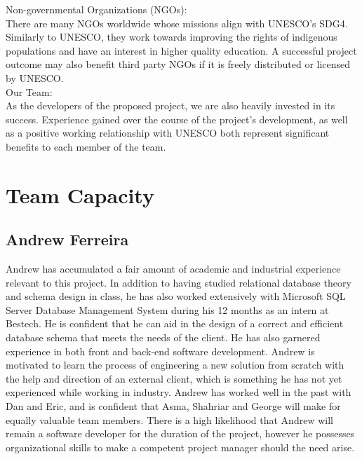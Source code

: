 \documentclass[11pt]{article}
\begin{document}
Non-governmental Organizations (NGOs): \\
There are many NGOs worldwide whose missions align with UNESCO's SDG4. Similarly to UNESCO, they work towards improving the rights of indigenous populations and have an interest in higher quality education. A successful project outcome may also benefit third party NGOs if it is freely distributed or licensed by UNESCO. \\

Our Team: \\
As the developers of the proposed project, we are also heavily invested in its success. Experience gained over the course of the project's development, as well as a positive working relationship with UNESCO both represent significant benefits to each member of the team. \\

\newpage

\section*{Team Capacity}

\subsection*{\textbf{Andrew Ferreira}}
Andrew has accumulated a fair amount of academic and industrial experience relevant to this project. In addition to having studied relational database theory and schema design in class, he has also worked extensively with Microsoft SQL Server Database Management System during his 12 months as an intern at Bestech. He is confident that he can aid in the design of a correct and efficient database schema that meets the needs of the client. He has also garnered experience in both front and back-end software development. Andrew is motivated to learn the process of engineering a new solution from scratch with the help and direction of an external client, which is something he has not yet experienced while working in industry. Andrew has worked well in the past with Dan and Eric, and is confident that Asma, Shahriar and George will make for equally valuable team members. There is a high likelihood that Andrew will remain a software developer for the duration of the project, however he possesses organizational skills to make a competent project manager should the need arise. \\
\end{document}
